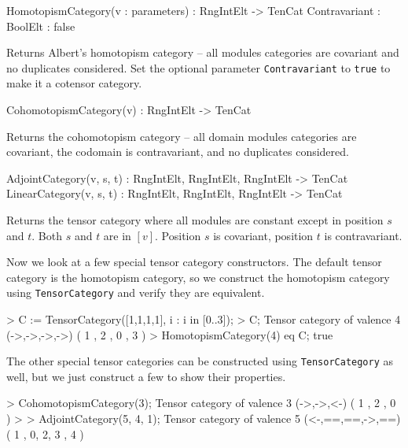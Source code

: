 \begin{intrinsics}
HomotopismCategory(v : parameters) : RngIntElt -> TenCat
    Contravariant : BoolElt : false
\end{intrinsics}

Returns Albert's homotopism category -- all modules categories are covariant 
and 
no duplicates considered.
Set the optional parameter {\tt Contravariant} to {\tt true} to make it a cotensor category.

\begin{intrinsics}
CohomotopismCategory(v) : RngIntElt -> TenCat
\end{intrinsics}

Returns the cohomotopism category -- all domain modules categories are 
covariant, the codomain is contravariant, and no duplicates considered.

\begin{intrinsics}
AdjointCategory(v, s, t) : RngIntElt, RngIntElt, RngIntElt -> TenCat
LinearCategory(v, s, t) : RngIntElt, RngIntElt, RngIntElt -> TenCat
\end{intrinsics}

Returns the tensor category where all modules are constant except in position 
$s$ and $t$.  Both $s$ and $t$ are in $[v]$.
Position $s$ is covariant, position $t$ is contravariant.

\begin{example}[TenCatSpecial]

Now we look at a few special tensor category constructors.
The default tensor category is the homotopism category, so we construct the homotopism category using \texttt{TensorCategory} and verify they are equivalent.
\begin{code}
> C := TensorCategory([1,1,1,1], {{i} : i in [0..3]});
> C;
Tensor category of valence 4 (->,->,->,->) ({ 1 },{ 2 },{ 0 },{ 3 })
> HomotopismCategory(4) eq C;
true
\end{code}

The other special tensor categories can be constructed using \texttt{TensorCategory} as well, but we just construct a few to show their properties.
\begin{code}
> CohomotopismCategory(3);
Tensor category of valence 3 (->,->,<-) ({ 1 },{ 2 },{ 0 })
> 
> AdjointCategory(5, 4, 1);
Tensor category of valence 5 (<-,==,==,->,==) ({ 1 },{ 0, 2, 3 },{ 4 })
\end{code}
\end{example}

